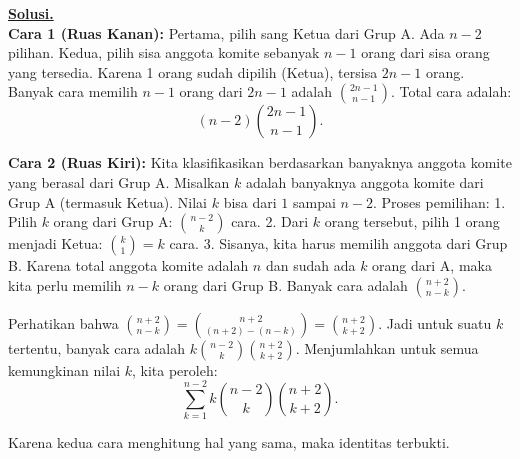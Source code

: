 \documentclass[12pt,twoside]{article}
\newenvironment{solution}
{
	\par\noindent\textbf{\underline{Solusi.}}\\
}
{
	\par
}
\begin{document}
\begin{enumerate}
\begin{solution}
          \textbf{Cara 1 (Ruas Kanan):}
          Pertama, pilih sang Ketua dari Grup A. Ada $n-2$ pilihan.
          Kedua, pilih sisa anggota komite sebanyak $n-1$ orang dari sisa orang yang tersedia. Karena 1 orang sudah dipilih (Ketua), tersisa $2n-1$ orang.
          Banyak cara memilih $n-1$ orang dari $2n-1$ adalah $\binom{2n-1}{n-1}$.
          Total cara adalah:
          \[ (n-2) \binom{2n-1}{n-1}. \]

          \textbf{Cara 2 (Ruas Kiri):}
          Kita klasifikasikan berdasarkan banyaknya anggota komite yang berasal dari Grup A.
          Misalkan $k$ adalah banyaknya anggota komite dari Grup A (termasuk Ketua). Nilai $k$ bisa dari $1$ sampai $n-2$.
          Proses pemilihan:
          1. Pilih $k$ orang dari Grup A: $\binom{n-2}{k}$ cara.
          2. Dari $k$ orang tersebut, pilih 1 orang menjadi Ketua: $\binom{k}{1} = k$ cara.
          3. Sisanya, kita harus memilih anggota dari Grup B. Karena total anggota komite adalah $n$ dan sudah ada $k$ orang dari A, maka kita perlu memilih $n-k$ orang dari Grup B. Banyak cara adalah $\binom{n+2}{n-k}$.

          Perhatikan bahwa $\binom{n+2}{n-k} = \binom{n+2}{(n+2)-(n-k)} = \binom{n+2}{k+2}$.
          Jadi untuk suatu $k$ tertentu, banyak cara adalah $k \binom{n-2}{k} \binom{n+2}{k+2}$.
          Menjumlahkan untuk semua kemungkinan nilai $k$, kita peroleh:
          \[ \sum_{k=1}^{n-2} k \binom{n-2}{k} \binom{n+2}{k+2}. \]

          Karena kedua cara menghitung hal yang sama, maka identitas terbukti.
        \end{solution}
\end{enumerate}
\newpage
\end{document}

